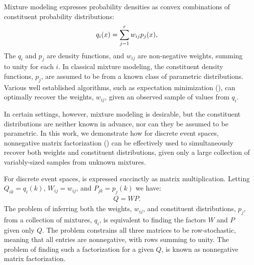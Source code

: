 \documentclass[conference]{IEEEtran}
\title{\vspace{-0.25em}\thetitle}
\author{
{\large{Stefan~Karpinski, John~R.~Gilbert, Elizabeth~M.~Belding}} \vspace{0.25em}\\
Department of Computer Science \\
University of California, Santa Barbara \vspace{0.35em}\\
\textit{\{sgk,gilbert,ebelding\}@cs.ucsb.edu}
}
\begin{document}
\maketitle

Mixture modeling expresses probability densities as convex combinations of constituent probability distributions:
\begin{align}\eqn{mixture-model}
  q_i(x) = \sum_{j=1}^r w_{ij} p_j(x),
\end{align}
The $q_i$ and $p_j$ are density functions, and $w_{ij}$ are non-negative weights, summing to unity for each $i$.
In classical mixture modeling, the constituent density functions, $p_j$, are assumed to be from a known class of parametric distributions.
Various well established algorithms, such as expectation minimization (), can optimally recover the weights, $w_{ij}$, given an observed sample of values from $q_i$.

In certain settings, however, mixture modeling is desirable, but the constituent distributions are neither known in advance, nor can they be assumed to be parametric.
In this work, we demonstrate how for discrete event spaces, nonnegative matrix factorization () can be effectively used to simultaneously recover both weights and constituent distributions, given only a large collection of variably-sized samples from unknown mixtures.

For discrete event spaces,  is expressed succinctly as matrix multiplication.
Letting $Q_{ik} = q_i(k)$, $W_{ij} = w_{ij}$, and $P_{jk} = p_j(k)$ we have:
\begin{align}
  Q = WP.
\end{align}
The problem of inferring both the weights, $w_{ij}$, and constituent distributions, $p_j$, from a collection of mixtures, $q_i$, is equivalent to finding the factors $W$ and $P$ given only $Q$.
The problem constrains all three matrices to be row-stochastic, meaning that all entries are nonnegative, with rows summing to unity.
The problem of finding such a factorization for a given $Q$, is known as nonnegative matrix factorization.


\end{document}
